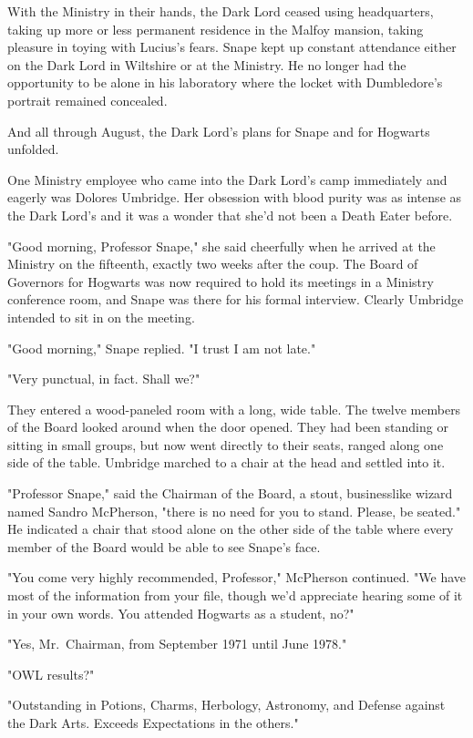 With the Ministry in their hands, the Dark Lord ceased using headquarters, taking up more or less permanent residence in the Malfoy mansion, taking pleasure in toying with Lucius's fears. Snape kept up constant attendance either on the Dark Lord in Wiltshire or at the Ministry. He no longer had the opportunity to be alone in his laboratory where the locket with Dumbledore's portrait remained concealed.

And all through August, the Dark Lord's plans for Snape and for Hogwarts unfolded.

One Ministry employee who came into the Dark Lord's camp immediately and eagerly was Dolores Umbridge. Her obsession with blood purity was as intense as the Dark Lord's and it was a wonder that she'd not been a Death Eater before.

"Good morning, Professor Snape," she said cheerfully when he arrived at the Ministry on the fifteenth, exactly two weeks after the coup. The Board of Governors for Hogwarts was now required to hold its meetings in a Ministry conference room, and Snape was there for his formal interview. Clearly Umbridge intended to sit in on the meeting.

"Good morning," Snape replied. "I trust I am not late."

"Very punctual, in fact. Shall we?"

They entered a wood-paneled room with a long, wide table. The twelve members of the Board looked around when the door opened. They had been standing or sitting in small groups, but now went directly to their seats, ranged along one side of the table. Umbridge marched to a chair at the head and settled into it.

"Professor Snape," said the Chairman of the Board, a stout, businesslike wizard named Sandro McPherson, "there is no need for you to stand. Please, be seated." He indicated a chair that stood alone on the other side of the table where every member of the Board would be able to see Snape's face.

"You come very highly recommended, Professor," McPherson continued. "We have most of the information from your file, though we'd appreciate hearing some of it in your own words. You attended Hogwarts as a student, no?"

"Yes, Mr.~Chairman, from September 1971 until June 1978."

"OWL results?"

"Outstanding in Potions, Charms, Herbology, Astronomy, and Defense against the Dark Arts. Exceeds Expectations in the others."


